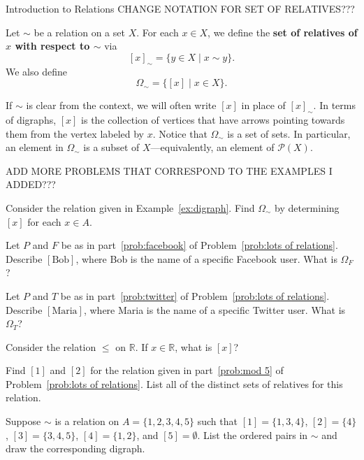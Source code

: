 \begin{section}{Introduction to Relations}
CHANGE NOTATION FOR SET OF RELATIVES???

\begin{definition}\label{def:relatives}
Let $\sim$ be a relation on a set $X$. For each $x\in X$, we define the \textbf{set of relatives of $x$ with respect to $\sim$} via
\[
[x]_{\sim}=\{y\in X\mid x\sim y\}.
\]
We also define
\[
\Omega_{\sim}=\{[x]\mid x\in X\}.
\]
\end{definition}

If $\sim$ is clear from the context, we will often write $[x]$ in place of $[x]_{\sim}$.  In terms of digraphs, $[x]$ is the collection of vertices that have arrows pointing towards them from the vertex labeled by $x$. Notice that $\Omega_{\sim}$ is a set of sets.  In particular, an element in $\Omega_{\sim}$ is a subset of $X$---equivalently, an element of $\mathcal{P}(X)$.

ADD MORE PROBLEMS THAT CORRESPOND TO THE EXAMPLES I ADDED???

\begin{problem}
Consider the relation given in Example~\ref{ex:digraph}. Find $\Omega_{\sim}$ by determining $[x]$ for each $x\in A$.
\end{problem}

\begin{problem}
Let $P$ and $F$ be as in part~\ref{prob:facebook} of Problem~\ref{prob:lots of relations}.  Describe $[\text{Bob}]$, where Bob is the name of a specific Facebook user.  What is $\Omega_F$?
\end{problem}

\begin{problem}
Let $P$ and $T$ be as in part~\ref{prob:twitter} of Problem~\ref{prob:lots of relations}.  Describe $[\text{Maria}]$, where Maria is the name of a specific Twitter user.  What is $\Omega_T$?
\end{problem}

\begin{problem}
Consider the relation $\leq$ on $\mathbb{R}$.  If $x\in \mathbb{R}$, what is $[x]$?
\end{problem}

\begin{problem}\label{prob:mod5classes}
Find $[1]$ and $[2]$ for the relation given in part~\ref{prob:mod 5} of Problem~\ref{prob:lots of relations}.  List all of the distinct sets of relatives for this relation.
\end{problem}

\begin{problem}\label{prob:find sim from Omega}
Suppose $\sim$ is a relation on $A=\{1,2,3,4,5\}$ such that $[1]=\{1,3,4\}$, $[2]=\{4\}$, $[3]=\{3,4,5\}$, $[4]=\{1,2\}$, and $[5]=\emptyset$. List the ordered pairs in $\sim$ and draw the corresponding digraph.
\end{problem}

\end{section}